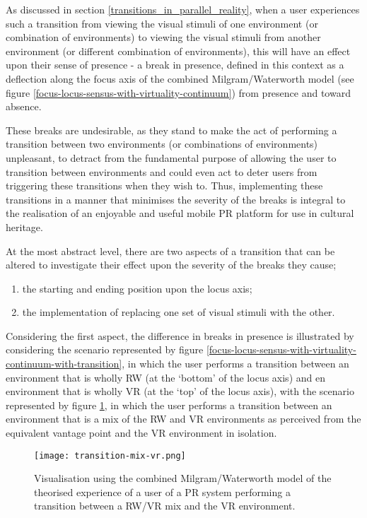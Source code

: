 As discussed in section \ref{transitions_in_parallel_reality}, when a user experiences such a transition from viewing the visual stimuli of one environment (or combination of environments) to viewing the visual stimuli from another environment (or different combination of environments), this will have an effect upon their sense of presence - a break in presence, defined in this context as a deflection along the focus axis of the combined Milgram/Waterworth model (see figure \ref{focus-locus-sensus-with-virtuality-continuum}) from presence and toward absence.

These breaks are undesirable, as they stand to make the act of performing a transition between two environments (or combinations of environments) unpleasant, to detract from the fundamental purpose of allowing the user to transition between environments and could even act to deter users from triggering these transitions when they wish to. Thus, implementing these transitions in a manner that minimises the severity of the breaks is integral to the realisation of an enjoyable and useful mobile PR platform for use in cultural heritage.

At the most abstract level, there are two aspects of a transition that can be altered to investigate their effect upon the severity of the breaks they cause;
\begin{enumerate}
	\item the starting and ending position upon the locus axis;
	\item the implementation of replacing one set of visual stimuli with the other.
\end{enumerate}

Considering the first aspect, the difference in breaks in presence is illustrated by considering the scenario represented by figure \ref{focus-locus-sensus-with-virtuality-continuum-with-transition}, in which the user performs a transition between an environment that is wholly RW (at the `bottom' of the locus axis) and en environment that is wholly VR (at the `top' of the locus axis), with the scenario represented by figure \ref{transition-mix-vr.png}, in which the user performs a transition between an environment that is a mix of the RW and VR environments as perceived from the equivalent vantage point and the VR environment in isolation.

\begin{figure}[h]
	\begin{center}
		\texttt{[image: transition-mix-vr.png]}
		\caption{Visualisation using the combined Milgram/Waterworth model of the theorised experience of a user of a PR system performing a transition between a RW/VR mix and the VR environment.}
		\label{transition-mix-vr.png}
	\end{center}
\end{figure}

